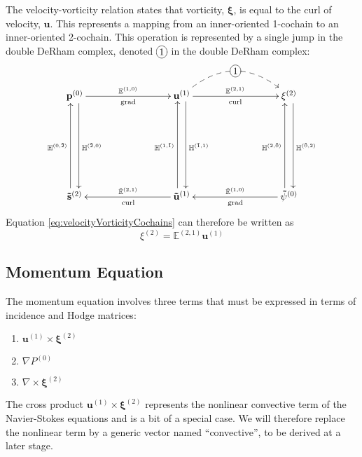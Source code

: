 The velocity-vorticity relation states that vorticity, $\mathbf{\xi}$, is equal to the curl of velocity, $\mathbf{u}$. This represents a mapping from an inner-oriented 1-cochain to an inner-oriented 2-cochain. This operation is represented by a single jump in the double DeRham complex, denoted $\xymatrix{*+[o][F-]{1}}$ in the double DeRham complex:
\begin{equation}
    \begin{gathered}
        \xymatrix@=20ex{
            \mathbf{p}^{(0)} \ar[r]^{\mathbb{E}^{(1,0)}}_{\text{grad}} \ar@<1ex>[d]^{\mathbb{H}^{(\tilde{2},0)}} & \mathbf{u}^{(1)} \ar[r]^{\mathbb{E}^{(2,1)}}_{\text{curl}} \ar @/^6ex/ @{-->} [r]|-*+[o][F-]{1} \ar@<1ex>[d]^{\mathbb{H}^{(\tilde{1},1)}} & \mathbf{\xi}^{(2)} \ar@<1ex>[d]^{\mathbb{H}^{(\tilde{0},2)}} \\
            \mathbf{\tilde{s}}^{(2)} \ar@<1ex>[u]^{\mathbb{H}^{(0,\tilde{2})}} & \mathbf{\tilde{u}}^{(1)} \ar[l]_{\tilde{\mathbb{E}}^{(2, 1)}}^{\text{curl}} \ar@<1ex>[u]^{\mathbb{H}^{(1,\tilde{1})}} & \mathbf{\tilde{\psi}}^{(0)} \ar[l]_{\tilde{\mathbb{E}}^{(1,0)}}^{\text{grad}} \ar@<1ex>[u]^{\mathbb{H}^{(2,\tilde{0})}}
        }
    \end{gathered}
    \label{eq:DeRhamVelocityVorticity}
\end{equation}
Equation \ref{eq:velocityVorticityCochains} can therefore be written as
\begin{equation}
    \xi^{(2)} = \mathbb{E}^{(2,1)} \mathbf{u}^{(1)}
\end{equation}

\subsection{Momentum Equation}

The momentum equation involves three terms that must be expressed in terms of incidence and Hodge matrices:
\begin{enumerate}
    \item $\mathbf{u}^{(1)} \times \mathbf{\xi}^{(2)}$
    \item $\nabla P^{(0)}$
    \item $\nabla \times \mathbf{\xi}^{(2)}$
\end{enumerate}


The cross product $\mathbf{u}^{(1)} \times \mathbf{\xi}^{(2)}$ represents the nonlinear convective term of the Navier-Stokes equations and is a bit of a special case. We will therefore replace the nonlinear term by a generic vector named ``convective'', to be derived at a later stage.

